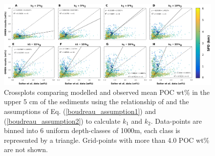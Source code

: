 \documentclass[gmd, manuscript]{copernicus}
\begin{document}
\begin{figure}[tbp]
\begin{center}
	\includegraphics[width=1.0\textwidth]{figures/OMEN-GENIE-Exp/0_Boudreau_CROSSPLOTS_290817_noDEPTHDEP_BigTriangles_120118.pdf}
	\caption{Crossplots comparing modelled and observed mean POC wt\% in the upper 5 cm of the sediments using the relationship of \citet{boudreau1997diagenetic} and the assumptions of Eq. (\ref{boudreau_assumption1}) and 
	(\ref{boudreau_assumption2}) to calculate $k_1$ and $k_2$.  Data-points are binned into 6 uniform depth-classes of 1000m, each class is represented by a triangle. 
	Grid-points with more than 4.0 POC wt\% are not shown.}
	\label{fig:OMEN_GENIE_Boudreau_results}
\end{center}
\end{figure}
\end{document}
